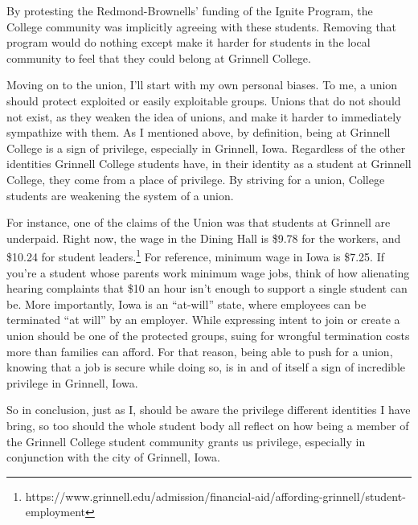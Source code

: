 \documentclass[12pt]{article}[titlepage]
\newcommand{\say}[1]{``#1''}
\newcommand{\1}{\={a}}
\newcommand{\2}{\={e}}
\newcommand{\3}{\={\i}}
\newcommand{\4}{\=o}
\newcommand{\5}{\=u}
\newcommand{\6}{\={A}}
\renewcommand{\,}{\textsuperscript{,}}
\begin{document}
By protesting the Redmond-Brownells' funding of the Ignite Program, the College community was implicitly agreeing with these students.
Removing that program would do nothing except make it harder for students in the local community to feel that they could belong at Grinnell College.

Moving on to the union, I'll start with my own personal biases.
To me, a union should protect exploited or easily exploitable groups.
Unions that do not should not exist, as they weaken the idea of unions, and make it harder to immediately sympathize with them.
As I mentioned above, by definition, being at Grinnell College is a sign of privilege, especially in Grinnell, Iowa.
Regardless of the other identities Grinnell College students have, in their identity as a student at Grinnell College, they come from a place of privilege.
By striving for a union, College students are weakening the system of a union.

For instance, one of the claims of the Union was that students at Grinnell are underpaid.
Right now, the wage in the Dining Hall is \$9.78 for the workers, and \$10.24 for student leaders.\footnote{https://www.grinnell.edu/admission/financial-aid/affording-grinnell/student-employment}
For reference, minimum wage in Iowa is \$7.25.
If you're a student whose parents work minimum wage jobs, think of how alienating hearing complaints that \$10 an hour isn't enough to support a single student can be.
More importantly, Iowa is an \say{at-will} state, where employees can be terminated \say{at will} by an employer.
While expressing intent to join or create a union should be one of the protected groups, suing for wrongful termination costs more than families can afford.
For that reason, being able to push for a union, knowing that a job is secure while doing so, is in and of itself a sign of incredible privilege in Grinnell, Iowa.

So in conclusion, just as I, should be aware the privilege different identities I have bring, so too should the whole student body all reflect on how being a member of the Grinnell College student community grants us privilege, especially in conjunction with the city of Grinnell, Iowa. 
\end{document}
